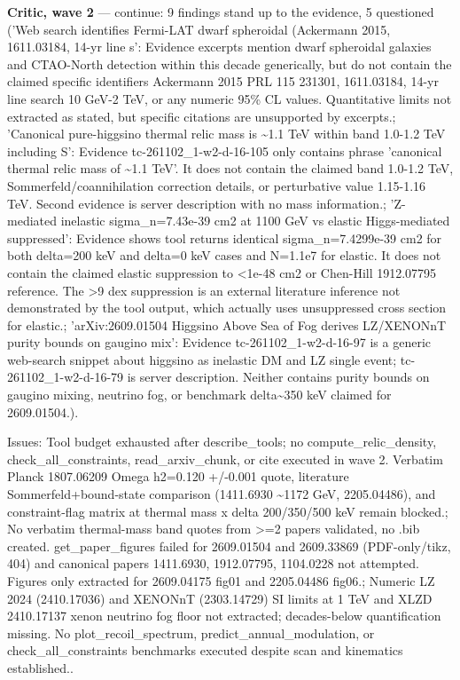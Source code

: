 \documentclass[11pt,a4paper]{article}
\begin{document}
\textbf{Critic, wave 2} --- continue: 9 findings stand up to the evidence, 5 questioned ('Web search identifies Fermi-LAT dwarf spheroidal (Ackermann 2015, 1611.03184, 14-yr line s': Evidence excerpts mention dwarf spheroidal galaxies and CTAO-North detection within this decade generically, but do not contain the claimed specific identifiers Ackermann 2015 PRL 115 231301, 1611.03184, 14-yr line search 10 GeV-2 TeV, or any numeric 95\% CL values. Quantitative limits not extracted as stated, but specific citations are unsupported by excerpts.; 'Canonical pure-higgsino thermal relic mass is \textasciitilde{}1.1 TeV within band 1.0-1.2 TeV including S': Evidence tc-261102\_1-w2-d-16-105 only contains phrase 'canonical thermal relic mass of \textasciitilde{}1.1 TeV'. It does not contain the claimed band 1.0-1.2 TeV, Sommerfeld/coannihilation correction details, or perturbative value 1.15-1.16 TeV. Second evidence is server description with no mass information.; 'Z-mediated inelastic sigma\_n=7.43e-39 cm2 at 1100 GeV vs elastic Higgs-mediated suppressed': Evidence shows tool returns identical sigma\_n=7.4299e-39 cm2 for both delta=200 keV and delta=0 keV cases and N=1.1e7 for elastic. It does not contain the claimed elastic suppression to \textless{}1e-48 cm2 or Chen-Hill 1912.07795 reference. The \textgreater{}9 dex suppression is an external literature inference not demonstrated by the tool output, which actually uses unsuppressed cross section for elastic.; 'arXiv:2609.01504 Higgsino Above Sea of Fog derives LZ/XENONnT purity bounds on gaugino mix': Evidence tc-261102\_1-w2-d-16-97 is a generic web-search snippet about higgsino as inelastic DM and LZ single event; tc-261102\_1-w2-d-16-79 is server description. Neither contains purity bounds on gaugino mixing, neutrino fog, or benchmark delta\textasciitilde{}350 keV claimed for 2609.01504.).

Issues: Tool budget exhausted after describe\_tools; no compute\_relic\_density, check\_all\_constraints, read\_arxiv\_chunk, or cite executed in wave 2. Verbatim Planck 1807.06209 Omega h2=0.120 +/-0.001 quote, literature Sommerfeld+bound-state comparison (1411.6930 \textasciitilde{}1172 GeV, 2205.04486), and constraint-flag matrix at thermal mass x delta 200/350/500 keV remain blocked.; No verbatim thermal-mass band quotes from \textgreater{}=2 papers validated, no .bib created. get\_paper\_figures failed for 2609.01504 and 2609.33869 (PDF-only/tikz, 404) and canonical papers 1411.6930, 1912.07795, 1104.0228 not attempted. Figures only extracted for 2609.04175 fig01 and 2205.04486 fig06.; Numeric LZ 2024 (2410.17036) and XENONnT (2303.14729) SI limits at 1 TeV and XLZD 2410.17137 xenon neutrino fog floor not extracted; decades-below quantification missing. No plot\_recoil\_spectrum, predict\_annual\_modulation, or check\_all\_constraints benchmarks executed despite scan and kinematics established..
\end{document}
